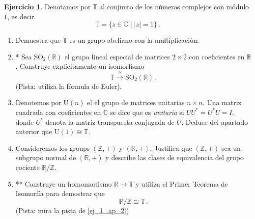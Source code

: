 \documentclass[a4paper,11pt]{amsart}
\theoremstyle{plain}
\theoremstyle{definition}
\newtheorem{ejercicio}[thm]{Ejercicio}
\theoremstyle{remark}
\begin{document}
\begin{ejercicio}
Denotamos por $\mathbb{T}$ al conjunto de los números complejos con módulo $1$, es decir 
\[ \mathbb{T} = \{ z \in \mathbb{C} \mid |z| = 1 \} \, .\] 
\begin{enumerate}[label = \roman*)]
    \item Demuestra que $\mathbb{T}$ es un grupo abeliano con la multiplicación. 
    \item{*} \label{ej_1_ap_2}Sea $\text{SO}_2(\mathbb{R})$ el grupo lineal especial de matrices $2 \times 2$ con coeficientes en $\mathbb{R}$. Construye explícitamente un isomorfismo 
    \[ \mathbb{T} \xrightarrow{\cong} \text{SO}_2(\mathbb{R}) \, .\]
    (Pista: utiliza la fórmula de Euler).
    \item Denotemos por $\text{U}(n)$ el el grupo de matrices unitarias $n \times n$. Una matriz cuadrada con coeficientes en $\mathbb{C}$ se dice que es \textit{unitaria} si $U U^* = U^* U = I$, donde $U^*$ denota la matriz transpuesta conjugada de $U$. Deduce del apartado anterior que $\text{U}(1) \cong \mathbb{T}$.
    \item Consideremos los groups $(\mathbb{Z}, +)$ y $(\mathbb{R}, +)$. Justifica que $(\mathbb{Z}, +)$ sea un subgrupo normal de $(\mathbb{R}, +)$ y describe las clases de equivalencia del grupo cociente $\mathbb{R}/\mathbb{Z}$. 
    \item{**} Construye un homomorfismo $\mathbb{R} \to \mathbb{T}$ y utiliza el Primer Teorema de Isomorfía para demostrar que 
    \[ \mathbb{R}/\mathbb{Z} \cong \mathbb{T} \, .\]
    (Pista: mira la pista de \ref{ej_1_ap_2})
\end{enumerate}
\end{ejercicio}
\end{document}
